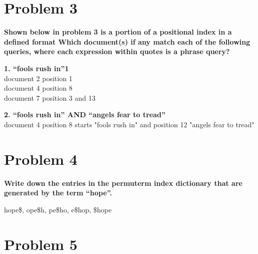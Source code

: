 \documentclass{article}
\begin{document}
%




\section{Problem 3}


\textbf{Shown below in problem 3 is a portion of a positional index in a defined format
Which document(s) if any match each of the following queries, where each expression within quotes is a phrase query?}

\textbf{1. “fools rush in”1\\}
document 2 position 1 \\
document 4 position 8 \\
document 7 position 3 and 13

\textbf{2. “fools rush in” AND “angels fear to tread” \\}
document 4 position 8 starts "fools rush in" and position 12 "angels fear to tread"



\section{Problem 4}

\textbf{Write down the entries in the permuterm index dictionary that are generated by the term “hope”.}

hope\$, ope\$h, pe\$ho, e\$hop, \$hope

%

\section{Problem 5}
\end{document}
